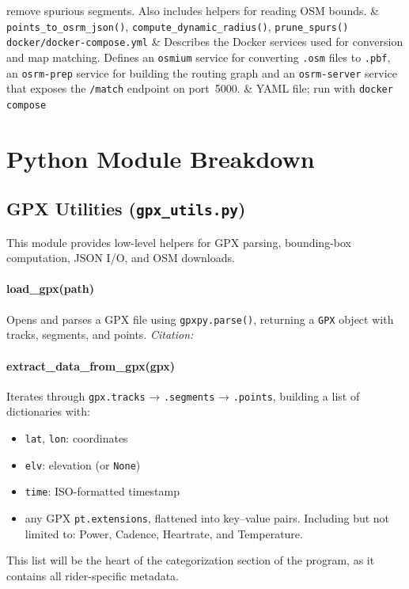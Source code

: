 \documentclass[11pt,a4paper]{article}
\begin{document}
\begin{longtable}
	remove spurious segments.  Also includes helpers for reading OSM bounds. &
	\texttt{points\_to\_osrm\_json()}, \texttt{compute\_dynamic\_radius()},
	\texttt{prune\_spurs()}                                                                                                                                                     \\
	\texttt{docker/docker-compose.yml}                                       & Describes the Docker services used for
	conversion and map matching.  Defines an \texttt{osmium} service for
	converting \texttt{.osm} files to \texttt{.pbf}, an \texttt{osrm-prep}
	service for building the routing graph and an \texttt{osrm-server} service
	that exposes the \texttt{/match} endpoint on port~5000.                  & YAML file; run
	with \texttt{docker compose}                                                                                                                                                \\
	\bottomrule
\end{longtable}
\section{Python Module Breakdown}

\subsection{GPX Utilities (\texttt{gpx\_utils.py})}

This module provides low-level helpers for GPX parsing, bounding-box computation, JSON I/O, and OSM downloads.

\paragraph{load\_gpx(path)}
Opens and parses a GPX file using \texttt{gpxpy.parse()}, returning a \texttt{GPX} object with tracks, segments, and points.
\emph{Citation:} \citep{gpxpy}

\paragraph{extract\_data\_from\_gpx(gpx)}
Iterates through \texttt{gpx.tracks} → \texttt{.segments} → \texttt{.points}, building a list of dictionaries with:
\begin{itemize}
	\item \texttt{lat}, \texttt{lon}: coordinates
	\item \texttt{elv}: elevation (or \texttt{None})
	\item \texttt{time}: ISO-formatted timestamp
	\item any GPX \texttt{pt.extensions}, flattened into key–value pairs. Including but not limited to: Power, Cadence, Heartrate, and Temperature.
\end{itemize}
This list will be the heart of the categorization section of the program, as it contains all rider-specific metadata.
\end{document}
